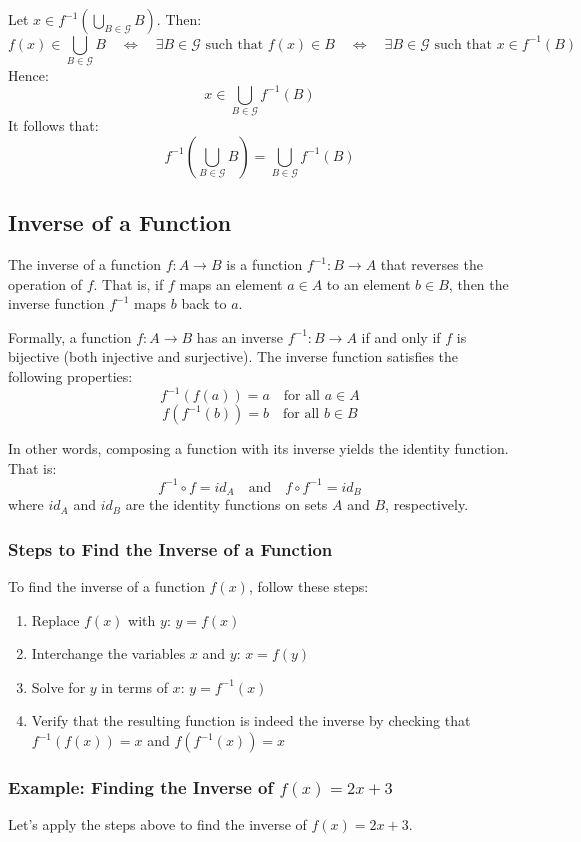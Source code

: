 Let \( x \in f^{-1} \left( \bigcup_{B \in \mathcal{G}} B \right) \). Then:
\[
	f(x) \in \bigcup_{B \in \mathcal{G}} B
	\quad \Leftrightarrow \quad
	\exists B \in \mathcal{G} \text{ such that } f(x) \in B
	\quad \Leftrightarrow \quad
	\exists B \in \mathcal{G} \text{ such that } x \in f^{-1}(B)
\]
Hence:
\[
	x \in \bigcup_{B \in \mathcal{G}} f^{-1}(B)
\]
It follows that:
\[
	f^{-1} \left( \bigcup_{B \in \mathcal{G}} B \right) = \bigcup_{B \in \mathcal{G}} f^{-1}(B)
\]


\subsection{Inverse of a Function}
The inverse of a function $f: A \rightarrow B$ is a function $f^{-1}: B \rightarrow A$ that reverses the operation of $f$. That is, if $f$ maps an element $a \in A$ to an element $b \in B$, then the inverse function $f^{-1}$ maps $b$ back to $a$.

\noindent Formally, a function $f: A \rightarrow B$ has an inverse $f^{-1}: B \rightarrow A$ if and only if $f$ is bijective (both injective and surjective). The inverse function satisfies the following properties:
\[
	f^{-1}(f(a)) = a \quad \text{for all } a \in A
\]
\[
	f(f^{-1}(b)) = b \quad \text{for all } b \in B
\]

In other words, composing a function with its inverse yields the identity function. That is:
\[
	f^{-1} \circ f = id_A \quad \text{and} \quad f \circ f^{-1} = id_B
\]
where $id_A$ and $id_B$ are the identity functions on sets $A$ and $B$, respectively.

\subsubsection{Steps to Find the Inverse of a Function}
To find the inverse of a function $f (x)$, follow these steps:
\begin{enumerate}
	\item Replace $f (x)$ with $y$: $y = f (x)$
	\item Interchange the variables $x$ and $y$: $x = f (y)$
	\item Solve for $y$ in terms of $x$: $y = f^{-1} (x)$
	\item Verify that the resulting function is indeed the inverse by checking that $f^{-1}(f(x)) = x$ and $f (f^{-1} (x)) = x$
\end{enumerate}

\subsubsection{Example: Finding the Inverse of \texorpdfstring{$f (x) = 2x + 3$}{}}
Let's apply the steps above to find the inverse of $f (x) = 2x + 3$.

